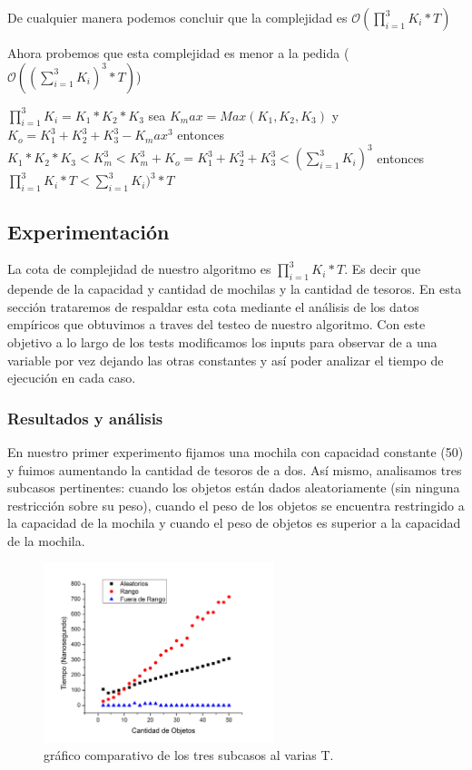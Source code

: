\documentclass[spanish,12pt]{article}
\begin{document}
De cualquier manera podemos concluir que la complejidad es $\mathcal{O}(\prod_{i=1}^{3}K_{i} * T)$

Ahora probemos que esta complejidad es menor a la pedida ($\mathcal{O}((\sum_{i=1}^{3}K_{i})^{3} * T)$)

$\prod_{i=1}^{3}K_{i}  = K_1*K_2*K_3$   sea $K_max = Max(K_1,K_2,K_3)$ y $K_o= K_1^3 + K_2^3 + K_3^3 - K_max^3$ entonces $K_1*K_2*K_3 < K_m^3 < K_m^3 + K_o = K_1^3+K_2^3+K_3^3 <(\sum_{i=1}^{3}K_{i})^{3}$ entonces $\prod_{i=1}^{3}K_{i}* T < \sum_{i=1}^{3}K_{i})^{3} * T $


\subsection{Experimentación}

La cota de complejidad de nuestro algoritmo es $\prod_{i=1}^{3}K_{i}* T$. Es decir que depende de la capacidad y cantidad de mochilas y la cantidad de tesoros.
En esta sección trataremos de respaldar esta cota mediante el análisis de los datos empíricos que obtuvimos a traves del testeo de nuestro algoritmo.
Con este objetivo a lo largo de los tests modificamos los inputs para observar de a una variable por vez dejando las otras constantes y así poder analizar el tiempo de ejecución en cada caso.


\subsubsection{Resultados y análisis}

En nuestro primer experimento fijamos una mochila con capacidad constante (50) y fuimos aumentando la cantidad de tesoros de a dos.
Así mismo, analisamos tres subcasos pertinentes: cuando los objetos están dados aleatoriamente (sin ninguna restricción sobre su peso), cuando el peso de los objetos se encuentra restringido a la capacidad de la mochila y cuando el peso de objetos es superior a la capacidad de la mochila. 

\begin{figure}[H]
\centering
\includegraphics[width=0.6\textwidth]{comparacionObjetos}
\caption{gráfico comparativo de los tres subcasos al varias T.}
\end{figure}
\end{document}

